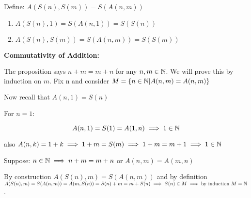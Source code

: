 Define: \(A(S(n), S(m)) = S(A(n, m))\)

\begin{enumerate}

	\item \(A(S(n), 1) = S(A(n, 1)) = S(S(n))\)

	\item \(A(S(n), S(m)) = S(A(n, m)) = S(S(m))\)

\end{enumerate}

\textbf{Commutativity of Addition:}
\vspace{\baselineskip}

The proposition says \(n + m = m + n\) for any \(n, m \in \mathbb{N}\). We will prove this by 
induction on \(m\). Fix n and consider \(M = \{ n \in \mathbb{N} | A(n, m) = A(n, m)\}\)

Now recall that \(A(n, 1) = S(n)\)
\vspace{\baselineskip}

For \(n = 1\):

\[
	A(n, 1) = S(1) = A(1, n) \implies 1 \in \mathbb{N}
\]

also \(A(n , k) = 1 + k \implies 1 + m = S(m) \implies 1 + m = m + 1 \implies 1 \in \mathbb{N}\)

Suppose: \(n \in \mathbb{N} \implies n + m = m + n\) or \(A(n, m) = A(m, n)\)

By construction \(A(S(n), m) = S(A(n, m))\) and by definition
\(A(S(n), m) = S(A(n, m)) = A(m, S(n)) = S(n) + m =  m + S(n) \implies S(n) \in M \implies 
\text{by induction } M = \mathbb{N}\).
